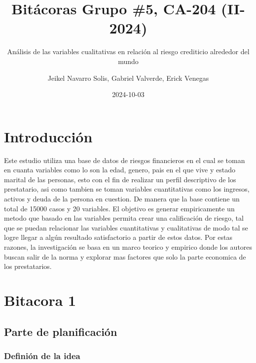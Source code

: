\documentclass[
  letterpaper,
  DIV=11,
  numbers=noendperiod]{scrreprt}
\title{Bitácoras Grupo \#5, CA-204 (II-2024)}
\subtitle{Análisis de las variables cualitativas en relación al riesgo
crediticio alrededor del mundo}
\author{Jeikel Navarro Solis, Gabriel Valverde, Erick Venegas}
\date{2024-10-03}
\renewcommand*\contentsname{Tabla de contenidos}
\newcommand\contentsname{Tabla de contenidos}
\begin{document}
\maketitle

\renewcommand*\contentsname{Tabla de contenidos}
{
\hypersetup{linkcolor=}
\setcounter{tocdepth}{2}
\tableofcontents
}


\chapter*{Introducción}\label{introducciuxf3n}


Este estudio utiliza una base de datos de riesgos financieros en el cual
se toman en cuanta variables como lo son la edad, genero, pais en el que
vive y estado marital de las personas, esto con el fin de realizar un
perfil descriptivo de los prestatario, asi como tambien se toman
variables cuantitativas como los ingresos, activos y deuda de la persona
en cuestion. De manera que la base contiene un total de 15000 casos y 20
variables. El objetivo es generar empiricamente un metodo que basado en
las variables permita crear una calificación de riesgo, tal que se
puedan relacionar las variables cuantitativas y cualitativas de modo tal
se logre llegar a algún resultado satisfactorio a partir de estos datos.
Por estas razones, la investigación se basa en un marco teorico y
empirico donde los autores buscan salir de la norma y explorar mas
factores que solo la parte economica de los prestatarios.


\chapter{Bitacora 1}\label{bitacora-1}

\section{Parte de planificación}\label{parte-de-planificaciuxf3n}

\subsection{Definión de la idea}\label{definiuxf3n-de-la-idea}
\end{document}
